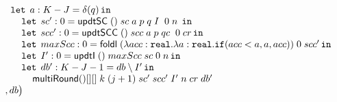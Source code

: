 \begin{figure}
\[\begin{array}{l}
 \hspace{0.4cm} \mathop{\mathtt{let}} \; a: K-J = \delta (q)  \mathop{ \mathtt{in}} \\
 \hspace{0.8cm} \mathop{\mathtt{let}} \; sc': 0 =  \mathsf{updtSC} \; () \; sc  \; a \; p
                \; q \; I \;  \; 0 \;  n \;  \mathop{ \mathtt{in}} \\
 \hspace{0.8cm} \mathop{\mathtt{let}} \; scc': 0 =  \mathsf{updtSCC} \; () \; scc \; a \; p
                \; qc \;  \; 0 \;  cr \mathop{ \mathtt{in}} \\
 \hspace{0.8cm} \mathop{\mathtt{let}} \; maxScc: 0 =  \mathsf{foldl} \; 
                (\lambda acc : \mathtt{real}. \lambda a: \mathtt{real}. 
                \mathtt{if} ( acc < a, a, acc)) \; 0 \; scc' \mathop{ \mathtt{in}} \\
 \hspace{0.8cm} \mathop{\mathtt{let}} \; I': 0 =  \mathsf{updtI}  \; () \; maxScc \; sc
                \; 0 \; n  \mathop{ \mathtt{in}} \\
 \hspace{0.8cm} \mathop{\mathtt{let}} \; db': K - J - 1 =  db \setminus I' \mathop{ \mathtt{in}} \\
 \hspace{1.2cm} \mathsf{multiRound} () [] [] \;  k 
                \; (j+1)  \; sc' \; scc' \; I'
                \; n \; cr \; db'\\ 
 \hspace{0.2cm} , db  \big )
\end{array}
\]

\end{figure}




